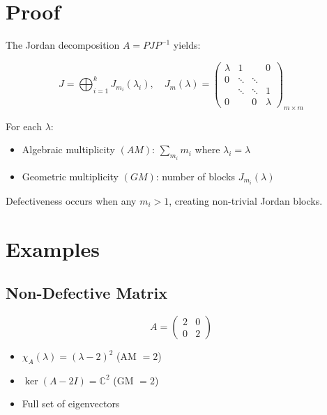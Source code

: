 \documentclass[aps,preprint]{revtex4}
\begin{document}
\section{Proof}

The Jordan decomposition $A = PJP^{-1}$ yields:

\begin{equation}
J=\bigoplus_{i=1}^{k}J_{m_{i}}(\lambda _{i}),\quad J_{m}(\lambda )=%
\begin{pmatrix}
\lambda  & 1 &  & 0 \\ 
0 & \ddots  & \ddots  &  \\ 
& \ddots  & \ddots  & 1 \\ 
0 &  & 0 & \lambda 
\end{pmatrix}%
_{m\times m}
\end{equation}

For each $\lambda$:

\begin{itemize}
\item Algebraic multiplicity $\left( AM\right) $: $\sum_{m_{i}}m_{i}$ where $%
\lambda _{i}=\lambda $

\item Geometric multiplicity $\left( GM\right) $: number of blocks $%
J_{m_{i}}(\lambda )$
\end{itemize}

Defectiveness occurs when any $m_i > 1$, creating non-trivial Jordan blocks.

\section{Examples}

\subsection{Non-Defective Matrix}

\begin{equation}
A = 
\begin{pmatrix}
2 & 0 \\ 
0 & 2%
\end{pmatrix}%
\end{equation}

\begin{itemize}
\item $\chi _{A}(\lambda )=(\lambda -2)^{2}$ (AM $=2$)

\item $\ker (A-2I)=\mathbb{C}^{2}$ (GM $=2$)

\item Full set of eigenvectors
\end{itemize}
\end{document}
